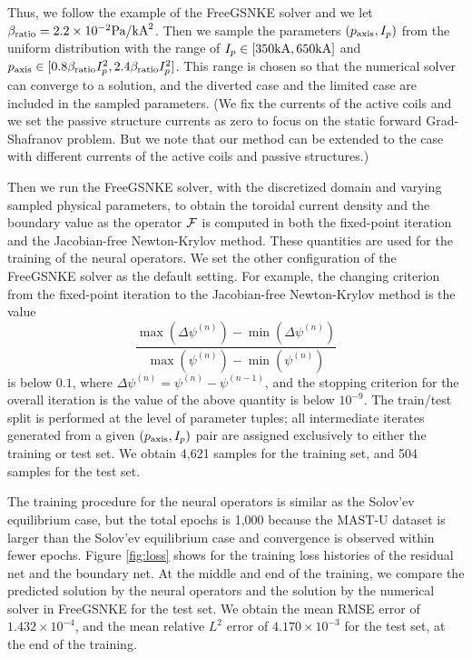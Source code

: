 Thus, we follow the example of the FreeGSNKE solver and
we let $\beta_{\te{ratio}} = 2.2 \times 10^{-2} \te{Pa} / \te{kA}^2$.
Then we sample the parameters $(p_{\te{axis}}, I_p)$ from the 
uniform distribution with 
the range of $I_p \in [350\te{kA}, 650\te{kA}]$ and 
$p_{\te{axis}} \in [0.8 \beta_{\te{ratio}} I_p^2, 2.4 \beta_{\te{ratio}}I_p^2]$.
This range is chosen so that the numerical solver can converge to a solution,
and the diverted case and the limited case are included in the sampled parameters.
(We fix the currents of the active coils and we set the passive structure currents as zero
to focus on the static forward Grad-Shafranov problem. 
But we note that our method can be extended to the case with different 
currents of the active coils and passive structures.)

Then we run the FreeGSNKE solver, with the discretized domain and 
varying sampled physical parameters, to obtain 
the toroidal current density and the boundary value as the operator 
$\cal{F}$ is computed in both the fixed-point iteration and the Jacobian-free Newton-Krylov method.
These quantities are used for the training of the neural operators.
We set the other configuration of the FreeGSNKE solver as the default setting.
For example, the changing criterion from the fixed-point iteration 
to the Jacobian-free Newton-Krylov method is the value
\[ \frac{\max \left( \Delta \psi^{(n)} \right) - \min \left( \Delta \psi^{(n)} \right)}
{\max\left(\psi^{(n)}\right) - \min\left(\psi^{(n)}\right)} 
\] is below $0.1$, where $\Delta \psi^{(n)} = \psi^{(n)} - \psi^{(n-1)}$,
and the stopping criterion for the overall iteration is the value of the
above quantity is below $10^{-9}$.
The train/test split is performed at the level of parameter tuples;
all intermediate iterates generated from a given $(p_\te{axis}, I_p)$ 
pair are assigned exclusively to either the training or test set.
We obtain 4,621 samples for the training set, and 504 samples for the test set. 

The training procedure for the neural operators is similar as the Solov'ev equilibrium case,
but the total epochs is 1,000 because the MAST-U dataset is larger than the Solov'ev equilibrium 
case and convergence is observed within fewer epochs.
Figure \ref{fig:loss} shows for the training loss histories
of the residual net and the boundary net.
At the middle and end of the training, 
we compare the predicted solution by the neural operators 
and the solution by the numerical solver in FreeGSNKE for the test set.
We obtain the mean RMSE error of $1.432 \times 10^{-4}$,
and the mean relative $L^2$ error of $4.170 \times 10^{-3}$ for the test set,
at the end of the training.

